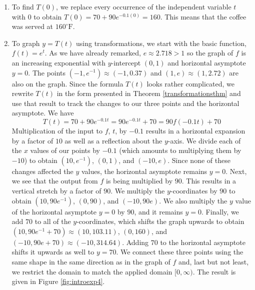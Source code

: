 {
\begin{enumerate}

\item  To find $T(0)$, we replace every occurrence of the independent variable $t$ with $0$ to obtain  $T(0) =70 + 90 e^{-0.1 (0)} = 160$.  This means that the coffee was served at $160^{\circ}\mbox{F}$.

\item  To graph $y = T(t)$ using transformations, we start with the basic function, $f(t)=e^{t}$.  As we have already remarked, $e \approx 2.718 > 1$ so the graph of $f$ is an increasing exponential with $y$-intercept $(0,1)$ and horizontal asymptote $y = 0$.  The points $\left(-1, e^{-1}\right) \approx (-1,0.37)$ and $(1,e) \approx (1,2.72)$ are also on the graph.  Since the formula $T(t)$ looks rather complicated, we rewrite $T(t)$ in the form presented in Theorem  \ref{transformationsthm} and use that result to track the changes to our three points and the horizontal asymptote.  We have \[T(t) = 70 + 90e^{-0.1t} = 90e^{-0.1t}+70 = 90 f(-0.1t)+70\]  Multiplication of the input to $f$, $t$, by $-0.1$ results in a horizontal expansion by a factor of $10$ as well as a reflection about the $y$-axis.  We divide each of the $x$ values of our points by $-0.1$ (which amounts to multiplying them by $-10$) to obtain $\left(10,e^{-1}\right)$, $(0,1)$, and $\left(-10, e\right)$.  Since none of these changes affected the $y$ values, the horizontal asymptote remains $y = 0$.  Next, we see that the output from $f$ is being multiplied by $90$.  This results in a vertical stretch by a factor of $90$.  We multiply the $y$-coordinates by $90$ to obtain $\left(10,90e^{-1}\right)$, $(0,90)$, and $\left(-10, 90e\right)$. We also multiply the $y$ value of the horizontal asymptote $y=0$ by $90$, and it remains $y=0$.  Finally, we add $70$ to all of the $y$-coordinates, which shifts the graph upwards to obtain $\left(10,90e^{-1} + 70\right) \approx (10, 103.11)$, $(0,160)$, and $\left(-10, 90e+ 70\right) \approx (-10,314.64)$.  Adding $70$ to the horizontal asymptote shifts it upwards as well to $y=70$.  We connect these three points using the same shape in the same direction as in the graph of $f$ and, last but not least, we restrict the domain to match the applied domain $[0, \infty)$.  The result is given in Figure \ref{fig:introexp4}.  



\end{enumerate}}
